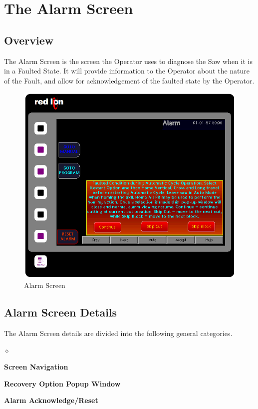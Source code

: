 \chapter{The Alarm Screen}
\section{Overview}
The Alarm Screen is the screen the Operator uses to diagnose the Saw when it is in a Faulted State. It will provide information to the Operator about the nature of the Fault, and allow for acknowledgement of the faulted state by the Operator.
\begin{figure}
	\centering
	\includegraphics[width=0.75
	\linewidth]{screen-captures/alarms/alarms}
	\caption{Alarm Screen}
	\label{fig:alarm-screen}
\end{figure}
\pagebreak
\section{Alarm Screen Details}
The Alarm Screen details are divided into the following general categories.
\begin{list}{$\diamond$}{}
	\item \textbf{Screen Navigation}
	\item \textbf{Recovery Option Popup Window}
	\item \textbf{Alarm Acknowledge/Reset}
\end{list}
